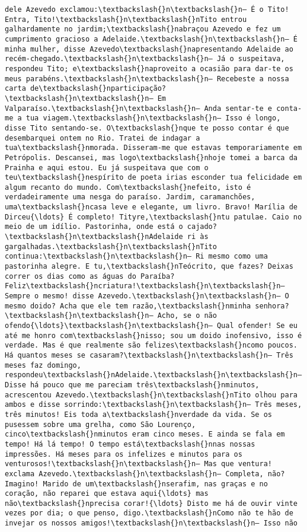 \begin{Verbatim}[commandchars=\\\{\}]
dele Azevedo exclamou:\textbackslash{}n\textbackslash{}n— É o Tito! Entra, Tito!\textbackslash{}n\textbackslash{}nTito entrou galhardamente no jardim;\textbackslash{}nabraçou Azevedo e fez um cumprimento gracioso a Adelaide.\textbackslash{}n\textbackslash{}n— É minha mulher, disse Azevedo\textbackslash{}napresentando Adelaide ao recém-chegado.\textbackslash{}n\textbackslash{}n— Já o suspeitava, respondeu Tito; e\textbackslash{}naproveito a ocasião para dar-te os meus parabéns.\textbackslash{}n\textbackslash{}n— Recebeste a nossa carta de\textbackslash{}nparticipação?\textbackslash{}n\textbackslash{}n— Em Valparaíso.\textbackslash{}n\textbackslash{}n— Anda sentar-te e conta-me a tua viagem.\textbackslash{}n\textbackslash{}n— Isso é longo, disse Tito sentando-se. O\textbackslash{}nque te posso contar é que desembarquei ontem no Rio. Tratei de indagar a tua\textbackslash{}nmorada. Disseram-me que estavas temporariamente em Petrópolis. Descansei, mas logo\textbackslash{}nhoje tomei a barca da Prainha e aqui estou. Eu já suspeitava que com o teu\textbackslash{}nespírito de poeta irias esconder tua felicidade em algum recanto do mundo. Com\textbackslash{}nefeito, isto é verdadeiramente uma nesga do paraíso. Jardim, caramanchões, uma\textbackslash{}ncasa leve e elegante, um livro. Bravo! Marília de Dirceu{\ldots} É completo! Tityre,\textbackslash{}ntu patulae. Caio no meio de um idílio. Pastorinha, onde está o cajado?\textbackslash{}n\textbackslash{}nAdelaide ri às gargalhadas.\textbackslash{}n\textbackslash{}nTito continua:\textbackslash{}n\textbackslash{}n— Ri mesmo como uma pastorinha alegre. E tu,\textbackslash{}nTeócrito, que fazes? Deixas correr os dias como as águas do Paraíba? Feliz\textbackslash{}ncriatura!\textbackslash{}n\textbackslash{}n— Sempre o mesmo! disse Azevedo.\textbackslash{}n\textbackslash{}n— O mesmo doido? Acha que ele tem razão,\textbackslash{}nminha senhora?\textbackslash{}n\textbackslash{}n— Acho, se o não ofendo{\ldots}\textbackslash{}n\textbackslash{}n— Qual ofender! Se eu até me honro com\textbackslash{}nisso; sou um doido inofensivo, isso é verdade. Mas é que realmente são felizes\textbackslash{}ncomo poucos. Há quantos meses se casaram?\textbackslash{}n\textbackslash{}n— Três meses faz domingo, respondeu\textbackslash{}nAdelaide.\textbackslash{}n\textbackslash{}n— Disse há pouco que me pareciam três\textbackslash{}nminutos, acrescentou Azevedo.\textbackslash{}n\textbackslash{}nTito olhou para ambos e disse sorrindo:\textbackslash{}n\textbackslash{}n— Três meses, três minutos! Eis toda a\textbackslash{}nverdade da vida. Se os pusessem sobre uma grelha, como São Lourenço, cinco\textbackslash{}nminutos eram cinco meses. E ainda se fala em tempo! Há lá tempo! O tempo está\textbackslash{}nnas nossas impressões. Há meses para os infelizes e minutos para os venturosos!\textbackslash{}n\textbackslash{}n— Mas que ventura! exclama Azevedo.\textbackslash{}n\textbackslash{}n— Completa, não? Imagino! Marido de um\textbackslash{}nserafim, nas graças e no coração, não reparei que estava aqui{\ldots} mas não\textbackslash{}nprecisa corar!{\ldots} Disto me há de ouvir vinte vezes por dia; o que penso, digo.\textbackslash{}nComo não te hão de invejar os nossos amigos!\textbackslash{}n\textbackslash{}n— Isso não 
\end{Verbatim}
